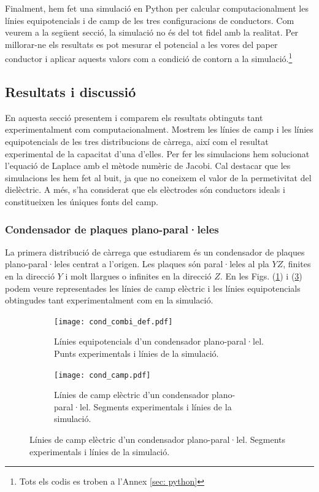 \documentclass[11pt]{article}
\numberwithin{equation}{section}
\numberwithin{figure}{section}
\numberwithin{table}{section}
\begin{document}
Finalment, hem fet una simulació en Python per calcular computacionalment les línies equipotencials i de camp de les tres configuracions de conductors. Com veurem a la següent secció, la simulació no és del tot fidel amb la realitat. Per millorar-ne els resultats es pot mesurar el potencial a les vores del paper conductor i aplicar aquests valors com a condició de contorn a la simulació.\footnote{\label{nota: codis}Tots els codis es troben a l'Annex \ref{sec: python}}

\subsection{Resultats i discussió}\label{sec: resultats}
En aquesta secció presentem i comparem els resultats obtinguts tant experimentalment com computacionalment. Mostrem les línies de camp i les línies equipotencials de les tres distribucions de càrrega, així com el resultat experimental de la capacitat d'una d'elles. Per fer les simulacions hem solucionat l'equació de Laplace amb el mètode numèric de Jacobi\footnotemark[3]. Cal destacar que les simulacions les hem fet al buit, ja que no coneixem el valor de la permetivitat del dielèctric. A més, s'ha considerat que els elèctrodes són conductors ideals i constitueixen les úniques fonts del camp.

\subsubsection{Condensador de plaques plano-paral·leles}\label{sec: cond}
La primera distribució de càrrega que estudiarem és un condensador de plaques plano-paral·leles centrat a l'origen. Les plaques són paral·leles al pla $YZ$, finites en la direcció $Y$ i molt llargues o infinites en la direcció $Z$.
En les Figs. (\ref{fig: cond_pot}) i (\ref{fig: cond_e}) podem veure representades les línies de camp elèctric i les línies equipotencials obtingudes tant experimentalment com en la simulació.   
\begin{figure}[h]
    \centering
    \begin{subfigure}{0.495\textwidth}
        \centering
        \texttt{[image: cond\_combi\_def.pdf]}
        \caption{Línies equipotencials d'un condensador plano-paral·lel. Punts experimentals i línies de la simulació.}
        \label{fig: cond_pot}
    \end{subfigure}
    \begin{subfigure}{0.495\textwidth} 
        \centering
        \texttt{[image: cond\_camp.pdf]}
        \caption{Línies de camp elèctric d'un condensador plano-paral·lel. Segments experimentals i línies de la simulació.}
        \label{fig: cond_e}
    \end{subfigure}
\end{figure}
\end{document}
